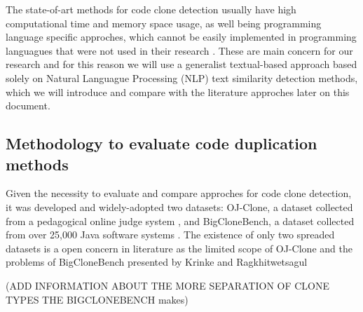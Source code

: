 The state-of-art methods for code clone detection usually have high computational time and memory space usage, as well being
programming language specific approches, which cannot be easily implemented in programming languagues that were not used in 
their research \citep{litreview}. These are main concern for our research and for this reason we will use a generalist textual-based 
approach based solely on Natural Languague Processing (NLP) text similarity detection methods, which we will introduce and compare
with the literature approches later on this document. 

\subsection{Methodology to evaluate code duplication methods}

\label{subsec:codemethods}

Given the necessity to evaluate and compare approches for code clone detection, it was developed and widely-adopted two datasets: 
OJ-Clone, a dataset collected from a pedagogical online judge system \citep{ojclone}, and BigCloneBench, a dataset collected from over 
25,000 Java software systems \citep{bigclonebench}. The existence of only two spreaded datasets is a open concern in literature as 
the limited scope of OJ-Clone and the problems of BigCloneBench presented by Krinke and Ragkhitwetsagul \citep{bigfail}

(ADD INFORMATION ABOUT THE MORE SEPARATION OF CLONE TYPES THE BIGCLONEBENCH makes)











